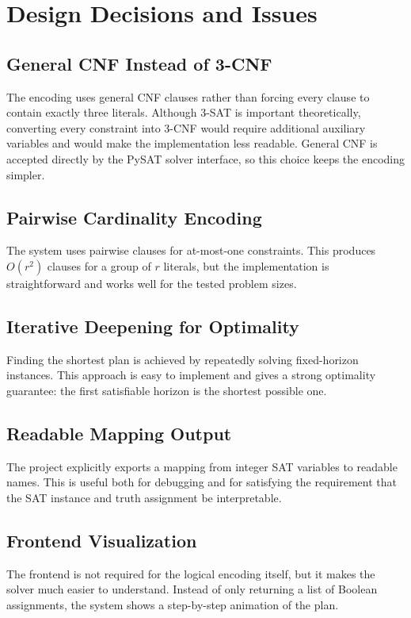 \section{Design Decisions and Issues} \label{sec:design-decisions-and-issues}

\subsection{General CNF Instead of 3-CNF} \label{subsec:general-cnf-instead-of-3-cnf}

The encoding uses general CNF clauses rather than forcing every clause to contain exactly three literals.
Although 3-SAT is important theoretically, converting every constraint into 3-CNF would require additional auxiliary variables and would make the implementation less readable.
General CNF is accepted directly by the PySAT solver interface, so this choice keeps the encoding simpler.

\subsection{Pairwise Cardinality Encoding} \label{subsec:pairwise-cardinality-encoding}

The system uses pairwise clauses for at-most-one constraints.
This produces $O(r^2)$ clauses for a group of $r$ literals, but the implementation is straightforward and works well for the tested problem sizes.

\subsection{Iterative Deepening for Optimality} \label{subsec:iterative-deepening-for-optimality}

Finding the shortest plan is achieved by repeatedly solving fixed-horizon instances.
This approach is easy to implement and gives a strong optimality guarantee: the first satisfiable horizon is the shortest possible one.

\subsection{Readable Mapping Output} \label{subsec:readable-mapping-output}

The project explicitly exports a mapping from integer SAT variables to readable names.
This is useful both for debugging and for satisfying the requirement that the SAT instance and truth assignment be interpretable.

\subsection{Frontend Visualization} \label{subsec:frontend-visualization}

The frontend is not required for the logical encoding itself, but it makes the solver much easier to understand.
Instead of only returning a list of Boolean assignments, the system shows a step-by-step animation of the plan.